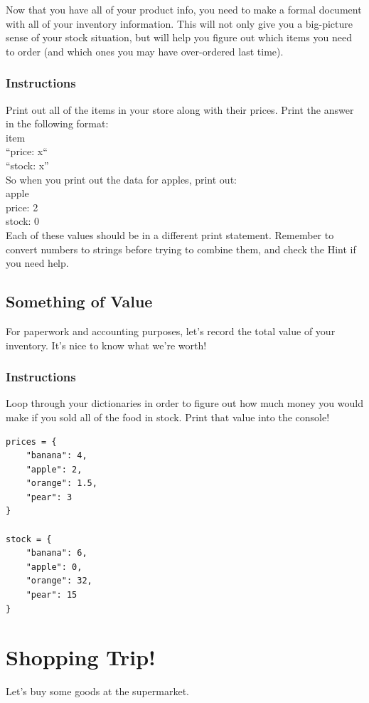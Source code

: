 \documentclass[12pt,a4paper,final,twoside,onecolumn,titlepage]{book}
\begin{document}
Now that you have all of your product info, you need to make a formal document with all of your inventory information. This will not only give you a big-picture sense of your stock situation, but will help you figure out which items you need to order (and which ones you may have over-ordered last time).
\subsubsection{Instructions}
Print out all of the items in your store along with their prices. Print the answer in the following format:
\\
item\\
“price: x“\\
“stock: x”\\

So when you print out the data for apples, print out:
\\
apple\\
price: 2\\
stock: 0\\

Each of these values should be in a different print statement. Remember to convert numbers to strings before trying to combine them, and check the Hint if you need help.

\subsection{Something of Value}

For paperwork and accounting purposes, let's record the total value of your inventory. It's nice to know what we're worth!
\subsubsection{Instructions}

Loop through your dictionaries in order to figure out how much money you would make if you sold all of the food in stock. Print that value into the console!
\begin{lstlisting}
prices = {
    "banana": 4,
    "apple": 2,
    "orange": 1.5,
    "pear": 3
}
    
stock = {
    "banana": 6,
    "apple": 0,
    "orange": 32,
    "pear": 15
}
\end{lstlisting}

    
\section{Shopping Trip!}
Let's buy some goods at the supermarket.
\end{document}
